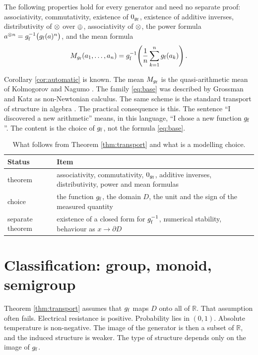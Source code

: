 \documentclass[11pt,a4paper]{article}
\begin{document}
\begin{corollary}
\label{cor:automatic}
The following properties hold for every generator and need no separate proof:
associativity, commutativity, existence of $0_{g_{\mathrm{f}}}$, existence of additive
inverses, distributivity of $\mathbin{\otimes}$ over $\mathbin{\oplus}$, associativity of $\mathbin{\otimes}$, the
power formula $a^{\mathbin{\otimes} n}=g_{\mathrm{f}}^{-1}\big(g_{\mathrm{f}}(a)^{n}\big)$, and the mean formula
\[
M_{g_{\mathrm{f}}}(a_{1},\dots,a_{n})=g_{\mathrm{f}}^{-1}\!\left(\frac{1}{n}\sum_{k=1}^{n}g_{\mathrm{f}}(a_{k})\right).
\]
\end{corollary}

Corollary \ref{cor:automatic} is known. The mean $M_{g_{\mathrm{f}}}$ is the
quasi-arithmetic mean of Kolmogorov and Nagumo
\cite{kolmogorov1930,nagumo1930}. The family \eqref{eq:base} was described by
Grossman and Katz \cite{grossman1972} as non-Newtonian calculus. The same scheme
is the standard transport of structure in algebra \cite{aczel1966}. The practical
consequence is this. The sentence ``I discovered a new arithmetic'' means, in
this language, ``I chose a new function $g_{\mathrm{f}}$''. The content is the choice of
$g_{\mathrm{f}}$, not the formula \eqref{eq:base}.

\begin{table}[t]
\centering
\small
\caption{What follows from Theorem \ref{thm:transport} and what is a modelling
choice.}
\label{tab:automatic}
\begin{tabularx}{\textwidth}{@{}lX@{}}
\toprule
\textbf{Status} & \textbf{Item} \\
\midrule
theorem & associativity, commutativity, $0_{g_{\mathrm{f}}}$, additive inverses,
distributivity, power and mean formulas \\
choice & the function $g_{\mathrm{f}}$, the domain $D$, the unit and the sign of the
measured quantity \\
separate theorem & existence of a closed form for $g_{\mathrm{f}}^{-1}$, numerical stability,
behaviour as $x\to\partial D$ \\
\bottomrule
\end{tabularx}
\end{table}

\section{Classification: group, monoid, semigroup}

Theorem \ref{thm:transport} assumes that $g_{\mathrm{f}}$ maps $D$ onto all of
$\mathbb{R}$. That assumption often fails. Electrical resistance is positive.
Probability lies in $(0,1)$. Absolute temperature is non-negative. The image of
the generator is then a subset of $\mathbb{R}$, and the induced structure is
weaker. The type of structure depends only on the image of $g_{\mathrm{f}}$.
\end{document}
